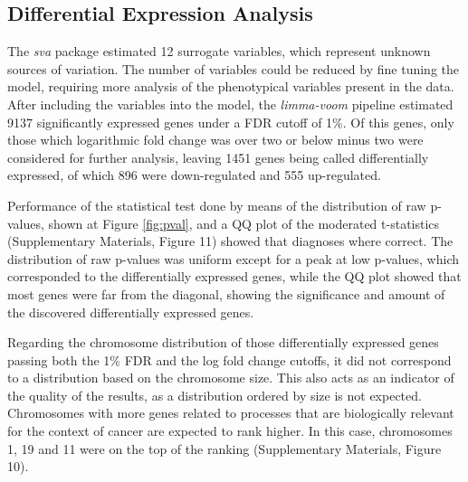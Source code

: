 \documentclass[9pt,twocolumn,twoside]{gsajnl}
\begin{document}
\subsection{Differential Expression Analysis}

The \textit{sva} package estimated 12 surrogate variables, which represent unknown sources of variation. The number of variables could be reduced by fine tuning the model, requiring more analysis of the phenotypical variables present in the data. After including the variables into the model, the \textit{limma-voom} pipeline estimated 9137 significantly expressed genes under a FDR cutoff of 1\%. Of this genes, only those which logarithmic fold change was over two or below minus two were considered for further analysis, leaving 1451 genes being called differentially expressed, of which 896 were down-regulated and 555 up-regulated.

Performance of the statistical test done by means of the distribution of raw p-values, shown at Figure \ref{fig:pval}, and a QQ plot of the moderated t-statistics (Supplementary Materials, Figure 11) showed that diagnoses where correct. The distribution of raw p-values was uniform except for a peak at low p-values, which corresponded to the differentially expressed genes, while the QQ plot showed that most genes were far from the diagonal, showing the significance and amount of the discovered differentially expressed genes.

Regarding the chromosome distribution of those differentially expressed genes passing both the 1\% FDR and the log fold change cutoffs, it did not correspond to a distribution based on the chromosome size. This also acts as an indicator of the quality of the results, as a distribution ordered by size is not expected. Chromosomes with more genes related to processes that are biologically relevant for the context of cancer are expected to rank higher. In this case, chromosomes 1, 19 and 11 were on the top of the ranking (Supplementary Materials, Figure 10).
\end{document}

